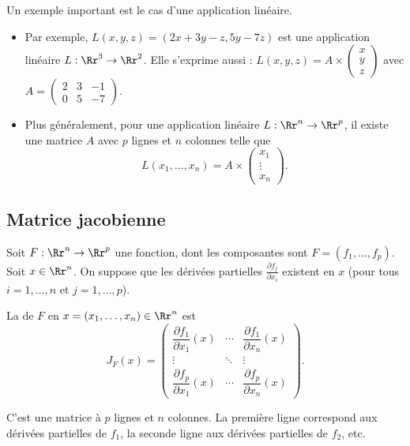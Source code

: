 \documentclass[11pt, class=report,crop=false]{standalone}
\begin{document}
\bigskip

Un exemple important est le cas d'une application linéaire.
\begin{itemize}
  \item Par exemple, $L(x,y,z) = (2x+3y-z,5y-7z)$ est une application linéaire $L : \Rr^3 \to \Rr^2$. Elle s'exprime aussi :
$L(x,y,z) = A \times \left(\begin{smallmatrix} x \\ y \\ z \end{smallmatrix}\right)$ avec 
$A = \begin{pmatrix}
2&3&-1\\
0&5&-7
\end{pmatrix}$.

  \item Plus généralement, pour une application linéaire 
$L : \Rr^n \to \Rr^p$, il existe une matrice $A$ avec $p$ lignes et $n$ colonnes telle que 
$$L(x_1,\ldots,x_n) = A \times \begin{pmatrix}x_1\\\vdots\\x_n\end{pmatrix}.$$
\end{itemize}




\subsection{Matrice jacobienne}

Soit $F : \Rr^n \to \Rr^p$ une fonction, dont les composantes sont
$F = (f_1,\ldots,f_p)$. Soit $x \in \Rr^n$. On suppose que les dérivées partielles
$\frac{\partial f_j}{\partial x_i}$ existent en $x$ (pour tous $i=1,\ldots,n$ et $j=1,\ldots,p$).

\begin{definition}
La  de $F$ en $x=(x_1,\ldots,x_n) \in \Rr^n$ est
$$
J_F(x) = 
\begin{pmatrix}
\dfrac{\partial f_1}{\partial x_1} (x) & \cdots & \dfrac{\partial f_1}{\partial x_n} (x) \\
\vdots & \ddots & \vdots \\
\dfrac{\partial f_p}{\partial x_1} (x) & \cdots & \dfrac{\partial f_p}{\partial x_n} (x)
\end{pmatrix}.
$$
\end{definition}


C'est une matrice à $p$ lignes et $n$ colonnes.
La première ligne correspond aux dérivées partielles de $f_1$, la seconde ligne aux dérivées partielles de $f_2$, etc.
\end{document}
